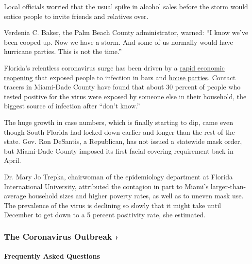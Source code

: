 Local officials worried that the usual spike in alcohol sales before the
storm would entice people to invite friends and relatives over.

Verdenia C. Baker, the Palm Beach County administrator, warned: ``I know
we've been cooped up. Now we have a storm. And some of us normally would
have hurricane parties. This is not the time.''

Florida's relentless coronavirus surge has been driven by a
\href{https://www.nytimes3xbfgragh.onion/2020/06/26/us/coronavirus-florida-texas-bars-closing.html}{rapid
economic reopening} that exposed people to infection in bars and
\href{https://www.nytimes3xbfgragh.onion/2020/07/06/us/coronavirus-florida-miami.html}{house
parties}. Contact tracers in Miami-Dade County have found that about 30
percent of people who tested positive for the virus were exposed by
someone else in their household, the biggest source of infection after
``don't know.''

The huge growth in case numbers, which is finally starting to dip, came
even though South Florida had locked down earlier and longer than the
rest of the state. Gov. Ron DeSantis, a Republican, has not issued a
statewide mask order, but Miami-Dade County imposed its first facial
covering requirement back in April.

Dr. Mary Jo Trepka, chairwoman of the epidemiology department at Florida
International University, attributed the contagion in part to Miami's
larger-than-average household sizes and higher poverty rates, as well as
to uneven mask use. The prevalence of the virus is declining so slowly
that it might take until December to get down to a 5 percent positivity
rate, she estimated.

\href{https://www.nytimes3xbfgragh.onion/news-event/coronavirus?action=click\&pgtype=Article\&state=default\&region=MAIN_CONTENT_3\&context=storylines_faq}{}

\hypertarget{the-coronavirus-outbreak-}{%
\subsubsection{The Coronavirus Outbreak
›}\label{the-coronavirus-outbreak-}}

\hypertarget{frequently-asked-questions}{%
\paragraph{Frequently Asked
Questions}\label{frequently-asked-questions}}

